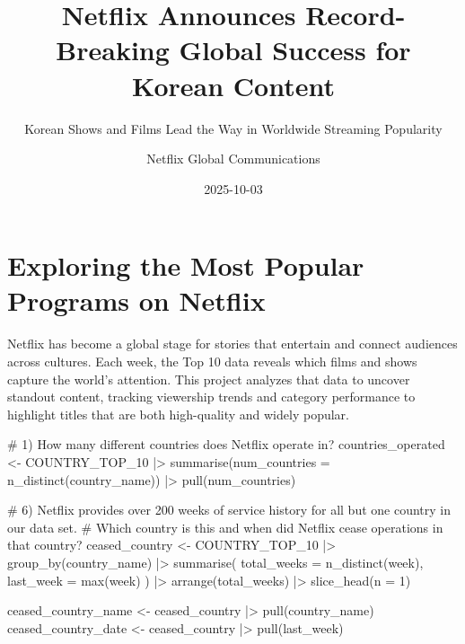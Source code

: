 \documentclass[
  12pt,
  letterpaper,
  DIV=11,
  numbers=noendperiod]{scrartcl}
\title{Netflix Announces Record-Breaking Global Success for Korean
Content}
\subtitle{Korean Shows and Films Lead the Way in Worldwide Streaming
Popularity}
\author{Netflix Global Communications}
\date{2025-10-03}
\newenvironment{Shaded}{\begin{snugshade}}{\end{snugshade}}
\newcommand{\AttributeTok}[1]{\textcolor[rgb]{0.40,0.45,0.13}{#1}}
\newcommand{\CommentTok}[1]{\textcolor[rgb]{0.37,0.37,0.37}{#1}}
\newcommand{\DecValTok}[1]{\textcolor[rgb]{0.68,0.00,0.00}{#1}}
\newcommand{\FunctionTok}[1]{\textcolor[rgb]{0.28,0.35,0.67}{#1}}
\newcommand{\NormalTok}[1]{\textcolor[rgb]{0.00,0.23,0.31}{#1}}
\newcommand{\OtherTok}[1]{\textcolor[rgb]{0.00,0.23,0.31}{#1}}
\newcommand{\SpecialCharTok}[1]{\textcolor[rgb]{0.37,0.37,0.37}{#1}}
\begin{document}
\maketitle


\section{Exploring the Most Popular Programs on
Netflix}\label{exploring-the-most-popular-programs-on-netflix}

Netflix has become a global stage for stories that entertain and connect
audiences across cultures. Each week, the Top 10 data reveals which
films and shows capture the world's attention. This project analyzes
that data to uncover standout content, tracking viewership trends and
category performance to highlight titles that are both high-quality and
widely popular.

\begin{Shaded}
\begin{Highlighting}[]
\CommentTok{\# 1) How many different countries does Netflix operate in?}
\NormalTok{countries\_operated }\OtherTok{\textless{}{-}}\NormalTok{ COUNTRY\_TOP\_10 }\SpecialCharTok{|\textgreater{}}
  \FunctionTok{summarise}\NormalTok{(}\AttributeTok{num\_countries =} \FunctionTok{n\_distinct}\NormalTok{(country\_name)) }\SpecialCharTok{|\textgreater{}}
  \FunctionTok{pull}\NormalTok{(num\_countries)}

\CommentTok{\# 6) Netflix provides over 200 weeks of service history for all but one country in our data set. }
\CommentTok{\# Which country is this and when did Netflix cease operations in that country?}
\NormalTok{ceased\_country }\OtherTok{\textless{}{-}}\NormalTok{ COUNTRY\_TOP\_10 }\SpecialCharTok{|\textgreater{}} 
  \FunctionTok{group\_by}\NormalTok{(country\_name) }\SpecialCharTok{|\textgreater{}} 
  \FunctionTok{summarise}\NormalTok{(}
    \AttributeTok{total\_weeks =} \FunctionTok{n\_distinct}\NormalTok{(week),}
    \AttributeTok{last\_week =} \FunctionTok{max}\NormalTok{(week)}
\NormalTok{  ) }\SpecialCharTok{|\textgreater{}} 
  \FunctionTok{arrange}\NormalTok{(total\_weeks) }\SpecialCharTok{|\textgreater{}} 
  \FunctionTok{slice\_head}\NormalTok{(}\AttributeTok{n =} \DecValTok{1}\NormalTok{)}

\NormalTok{ceased\_country\_name }\OtherTok{\textless{}{-}}\NormalTok{ ceased\_country }\SpecialCharTok{|\textgreater{}} \FunctionTok{pull}\NormalTok{(country\_name)}
\NormalTok{ceased\_country\_date }\OtherTok{\textless{}{-}}\NormalTok{ ceased\_country }\SpecialCharTok{|\textgreater{}} \FunctionTok{pull}\NormalTok{(last\_week)}
\end{Highlighting}
\end{Shaded}
\end{document}
